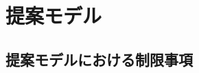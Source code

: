 \documentclass[12pt,a4paper]{jbook}
\begin{document}
\chapter{提案モデル}

\section{提案モデルにおける制限事項}
\end{document}
